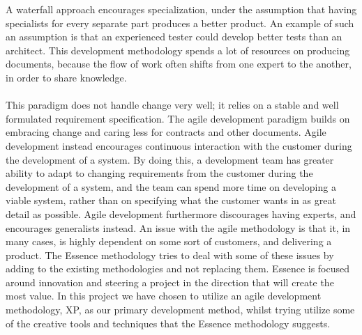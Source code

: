 A waterfall approach encourages specialization, under the assumption that having specialists for every separate part produces a better product. An example of such an assumption is that an experienced tester could develop better tests than an architect. This development methodology spends a lot of resources on producing documents, because the flow of work often shifts from one expert to the another, in order to share knowledge. 
\\\\
This paradigm does not handle change very well; it relies on a stable and well formulated requirement specification. The agile development paradigm builds on embracing change and caring less for contracts and other documents. Agile development instead encourages continuous interaction with the customer during the development of a system. By doing this, a development team has greater ability to adapt to changing requirements from the customer during the development of a system, and the team can spend more time on developing a viable system, rather than on specifying what the customer wants in as great detail as possible. Agile development furthermore discourages having experts, and encourages generalists instead.
\newpage
An issue with the agile methodology is that it, in many cases, is highly dependent on some sort of customers, and delivering a product. The Essence methodology tries to deal with some of these issues by adding to the existing methodologies and not replacing them. Essence is focused around innovation and steering a project in the direction that will create the most value. In this project we have chosen to utilize an agile development methodology, XP, as our primary development method, whilst trying utilize some of the creative tools and techniques that the Essence methodology suggests. 





